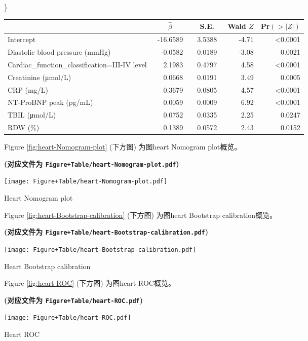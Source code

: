 \documentclass[
]{article}
\begin{document}
\}

\setlongtables

\begin{longtable}{lrrrr}\hline
\multicolumn{1}{l}{}&\multicolumn{1}{c}{$\hat{\beta}$}&\multicolumn{1}{c}{S.E.}&\multicolumn{1}{c}{Wald $Z$}&\multicolumn{1}{c}{Pr$(>|Z|)$}\tabularnewline
\hline
\endhead
\hline
\endfoot
Intercept&~-16.6589~&~3.5388~&-4.71&\textless 0.0001\tabularnewline
Diastolic blood pressure (mmHg)&~ -0.0582~&~0.0189~&-3.08&0.0021\tabularnewline
Cardiac\_function\_classification=III-IV level&~  2.1983~&~0.4797~& 4.58&\textless 0.0001\tabularnewline
Creatinine (μmol/L)&~  0.0668~&~0.0191~& 3.49&0.0005\tabularnewline
CRP (mg/L)&~  0.3679~&~0.0805~& 4.57&\textless 0.0001\tabularnewline
NT-ProBNP peak (pg/mL)&~  0.0059~&~0.0009~& 6.92&\textless 0.0001\tabularnewline
TBIL (μmol/L)&~  0.0752~&~0.0335~& 2.25&0.0247\tabularnewline
RDW (\%)&~  0.1389~&~0.0572~& 2.43&0.0152\tabularnewline
\hline
\end{longtable}
\addtocounter{table}{-1}

Figure \ref{fig:heart-Nomogram-plot} (下方图) 为图heart Nomogram plot概览。

\textbf{(对应文件为 \texttt{Figure+Table/heart-Nomogram-plot.pdf})}

\def\@captype{figure}
\begin{center}
\texttt{[image: Figure+Table/heart-Nomogram-plot.pdf]}
\caption{Heart Nomogram plot}\label{fig:heart-Nomogram-plot}
\end{center}

Figure \ref{fig:heart-Bootstrap-calibration} (下方图) 为图heart Bootstrap calibration概览。

\textbf{(对应文件为 \texttt{Figure+Table/heart-Bootstrap-calibration.pdf})}

\def\@captype{figure}
\begin{center}
\texttt{[image: Figure+Table/heart-Bootstrap-calibration.pdf]}
\caption{Heart Bootstrap calibration}\label{fig:heart-Bootstrap-calibration}
\end{center}

Figure \ref{fig:heart-ROC} (下方图) 为图heart ROC概览。

\textbf{(对应文件为 \texttt{Figure+Table/heart-ROC.pdf})}

\def\@captype{figure}
\begin{center}
\texttt{[image: Figure+Table/heart-ROC.pdf]}
\caption{Heart ROC}\label{fig:heart-ROC}
\end{center}
\end{document}
